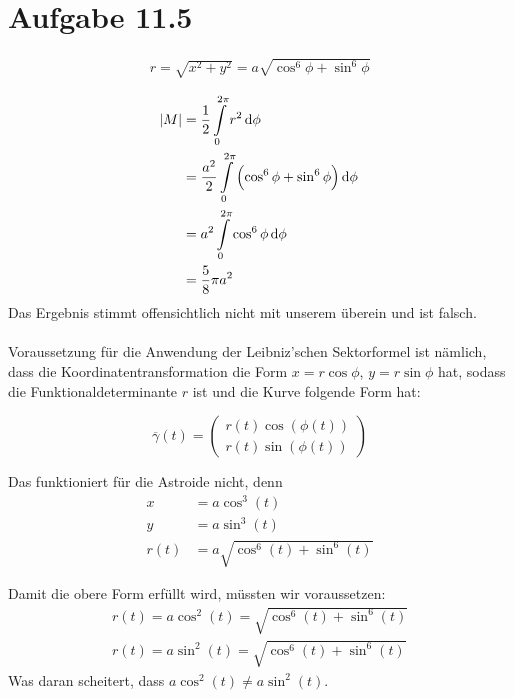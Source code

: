\documentclass[a4paper,german,12pt,smallheadings]{scrartcl}
\begin{document}
\section*{Aufgabe 11.5}

\begin{align*}
  r = \sqrt{x^2 + y^2} = a \sqrt{\cos^6 \phi + \sin^6 \phi}
\end{align*}

\begin{align*}
  \envert{M} &= \frac{1}{2} \int\limits_0^{2 \pi} r^2 \dif \phi \\
             &= \frac{a^2}{2} \int\limits_0^{2 \pi} \del{\cos^6 \phi + \sin^6 \phi} \dif \phi \\
             &= a^2 \int\limits_0^{2 \pi} \cos^6 \phi \dif \phi \\
             &= \frac{5}{8} \pi a^2
\end{align*}
Das Ergebnis stimmt offensichtlich nicht mit unserem überein und ist falsch.\\ 
\\
Voraussetzung für die Anwendung der Leibniz'schen Sektorformel ist nämlich, dass die Koordinatentransformation die Form $x = r \cos \phi$,
$y = r \sin \phi$ hat, sodass die Funktionaldeterminante $r$ ist und die Kurve folgende Form hat:

\begin{equation*}
  \overline{\gamma}(t) = \begin{pmatrix} r(t) \cos(\phi(t)) \\ r(t) \sin(\phi(t)) \end{pmatrix}
\end{equation*}

Das funktioniert für die Astroide nicht, denn
\begin{align*}
  x &= a \cos^3(t)\\
  y &= a\sin^3(t) \\
  r(t) &= a\sqrt{\cos^6(t) + \sin^6(t)}
\end{align*}

Damit die obere Form erfüllt wird, müssten wir voraussetzen:
\begin{align*}
  r(t) = a \cos^2(t) = \sqrt{\cos^6(t) + \sin^6(t)} \\
  r(t) = a \sin^2(t) = \sqrt{\cos^6(t) + \sin^6(t)} 
\end{align*}
Was daran scheitert, dass $a \cos^2(t) \neq a \sin^2(t)$.
\end{document}
